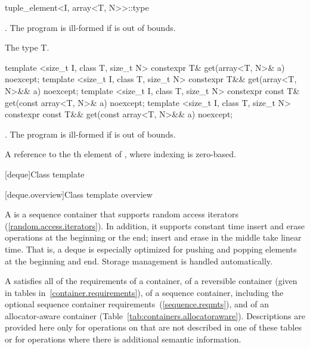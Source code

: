 %
\begin{itemdecl}
tuple_element<I, array<T, N>>::type
\end{itemdecl}

\begin{itemdescr}
\pnum
\requires {}. The program is ill-formed if  is out of bounds.

\pnum
\cvalue  The type T.
\end{itemdescr}

%
%
\begin{itemdecl}
template <size_t I, class T, size_t N>
  constexpr T& get(array<T, N>& a) noexcept;
template <size_t I, class T, size_t N>
  constexpr T&& get(array<T, N>&& a) noexcept;
template <size_t I, class T, size_t N>
  constexpr const T& get(const array<T, N>& a) noexcept;
template <size_t I, class T, size_t N>
  constexpr const T&& get(const array<T, N>&& a) noexcept;
\end{itemdecl}

\begin{itemdescr}
\pnum
\requires {}. The program is ill-formed if  is out of bounds.

\pnum
\returns A reference to the th element of ,
where indexing is zero-based.
\end{itemdescr}

[deque]{Class template }

[deque.overview]{Class template  overview}

\pnum
A
%
is a sequence container that supports random access iterators (\ref{random.access.iterators}).
In addition, it supports constant time insert and erase operations at the beginning or the end;
insert and erase in the middle take linear time.
That is, a deque is especially optimized for pushing and popping elements at the beginning and end.
Storage management is handled automatically.

\pnum
A
satisfies all of the requirements of a container, of a reversible container
(given in tables in~\ref{container.requirements}), of a sequence container,
including the optional sequence container requirements~(\ref{sequence.reqmts}), and of an allocator-aware container (Table~\ref{tab:containers.allocatoraware}).
Descriptions are provided here only for operations on
that are not described in one of these tables
or for operations where there is additional semantic information.


